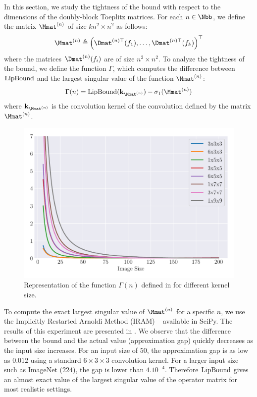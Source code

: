 In this section, we study the tightness of the bound with respect to the dimensions of the doubly-block Toeplitz matrices.
For each $n \in \Nbb$, we define the matrix  $\Mmat^{(n)}$ of size $kn^2 \times n^2$ as follows:
\begin{equation}
  \Mmat^{(n)} \triangleq \textstyle \leftmat \Dmat^{(n)\top}(f_1), \dots, \Dmat^{(n)\top}(f_k) \textstyle \rightmat^\top
\end{equation}
where the matrices $\Dmat^{(n)}(f_i)$ are of size $n^2 \times n^2$. 
To analyze the tightness of the bound, we define the function $\Gamma$, which computes the difference between $\mathrm{LipBound}$ and the largest singular value of the function $\Mmat^{(n)}$:
\begin{equation} \label{equation:function_convergence}
  \Gamma(n) = \lipbound(\mathbf{k}_{\Mmat^{(n)}}) - \sigma_1(\Mmat^{(n)})
\end{equation}
where $\mathbf{k}_{\Mmat^{(n)}}$ is the  convolution kernel of the convolution defined by the matrix $\Mmat^{(n)}$.

\begin{figure}[ht]
  \centering
  \includegraphics[width=\scalefigure\textwidth]{figures/main/ch5-lipschitz_regularization/convergence_bounds.pdf}
  \caption{Representation of the function $\Gamma(n)$ defined in  for different kernel size.}
  \label{figure:convergence_bound}
\end{figure}


To compute the exact largest singular value of $\Mmat^{(n)}$ for a specific $n$, we use the Implicitly Restarted Arnoldi Method (IRAM) ~\cite{lehoucq1996deflation} available in SciPy.
The results of this experiment are presented in .
We observe that the difference between the bound and the actual value (approximation gap) quickly decreases as the input size increases.
For an input size of $50$, the approximation gap is as low as $0.012$ using a standard $6\times3\times3$ convolution kernel.
For a larger input size such as ImageNet ($224$), the gap is lower than $4.10^{-4}$.
Therefore $\mathrm{LipBound}$ gives an almost exact value of the largest singular value of the operator matrix for most realistic settings.

